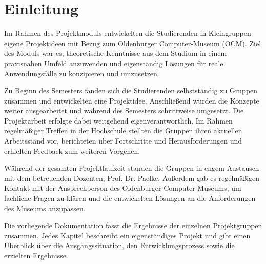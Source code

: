 \chapter{Einleitung}
Im Rahmen des Projektmoduls entwickelten die Studierenden in Kleingruppen eigene Projektideen mit Bezug zum Oldenburger Computer-Museum (OCM). Ziel des Moduls war es, theoretische Kenntnisse aus dem Studium in einem praxisnahen Umfeld anzuwenden und eigenständig Lösungen für reale Anwendungsfälle zu konzipieren und umzusetzen.

Zu Beginn des Semesters fanden sich die Studierenden selbstständig zu Gruppen zusammen und entwickelten eine Projektidee. Anschließend wurden die Konzepte weiter ausgearbeitet und während des Semesters schrittweise umgesetzt. Die Projektarbeit erfolgte dabei weitgehend eigenverantwortlich. Im Rahmen regelmäßiger Treffen in der Hochschule stellten die Gruppen ihren aktuellen Arbeitsstand vor, berichteten über Fortschritte und Herausforderungen und erhielten Feedback zum weiteren Vorgehen.

Während der gesamten Projektlaufzeit standen die Gruppen in engem Austausch mit dem betreuenden Dozenten, Prof. Dr. Paelke. Außerdem gab es regelmäßigen Kontakt mit der Ansprechperson des Oldenburger Computer-Museums, um fachliche Fragen zu klären und die entwickelten Lösungen an die Anforderungen des Museums anzupassen.

Die vorliegende Dokumentation fasst die Ergebnisse der einzelnen Projektgruppen zusammen. Jedes Kapitel beschreibt ein eigenständiges Projekt und gibt einen Überblick über die Ausgangssituation, den Entwicklungsprozess sowie die erzielten Ergebnisse.

